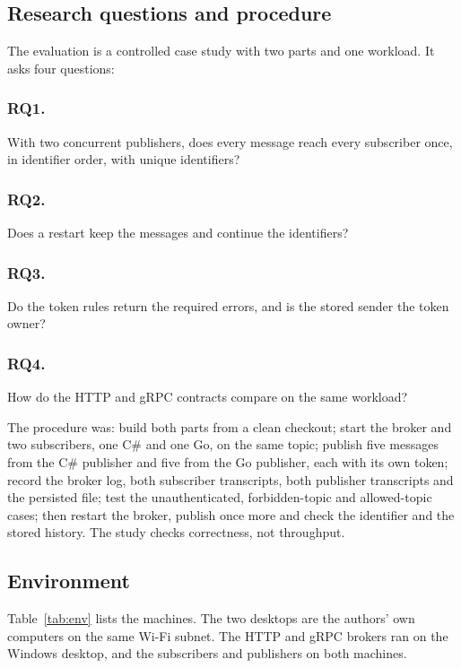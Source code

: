 \documentclass[12pt,a4paper]{article}
\begin{document}
\subsection{Research questions and procedure}
The evaluation is a controlled case study with two parts and one workload. It
asks four questions:

  \subsubsection{RQ1.} With two concurrent publishers, does every message reach every
  subscriber once, in identifier order, with unique identifiers?
  \subsubsection{RQ2.} Does a restart keep the messages and continue the identifiers?
  \subsubsection{RQ3.} Do the token rules return the required errors, and is the stored
  sender the token owner?
  \subsubsection{RQ4.} How do the HTTP and gRPC contracts compare on the same workload?

The procedure was: build both parts from a clean checkout; start the broker and
two subscribers, one C\# and one Go, on the same topic; publish five messages
from the C\# publisher and five from the Go publisher, each with its own token;
record the broker log, both subscriber transcripts, both publisher transcripts
and the persisted file; test the unauthenticated, forbidden-topic and
allowed-topic cases; then restart the broker, publish once more and check the
identifier and the stored history. The study checks correctness, not throughput.

\subsection{Environment}
Table~\ref{tab:env} lists the machines. The two desktops are the authors' own
computers on the same Wi-Fi subnet. The HTTP and gRPC brokers ran on the
Windows desktop, and the subscribers and publishers on both machines.
\end{document}
